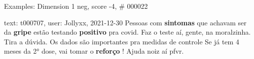 \begin{frame}{Examples: Dimension 1 neg, score -4, \# 000022}
\footnotesize
\begin{alertblock}{text: t000707, user: Jollyxx, 2021-12-30}
Pessoas com \textbf{sintomas} que achavam ser da \textbf{gripe} estão testando 
\textbf{positivo} pra covid. Faz o teste aí, gente, na moralzinha. Tira a 
dúvida. Os dados são importantes pra medidas de controle  Se 
já tem 4 meses da 2° dose, vai tomar o \textbf{reforço} ! Ajuda noiz aí pfvr. 
\end{alertblock}
\end{frame}
